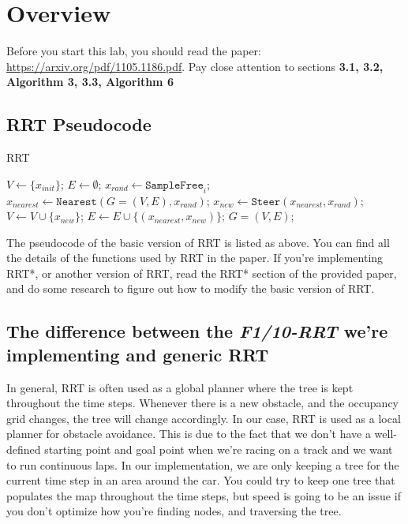 \documentclass[letter]{article}
\begin{document}
\section{Overview}
Before you start this lab, you should read the paper: \href{https://arxiv.org/pdf/1105.1186.pdf}{https://arxiv.org/pdf/1105.1186.pdf}. Pay close attention to sections \textbf{3.1, 3.2, Algorithm 3, 3.3, Algorithm 6}
\subsection{RRT Pseudocode}
\begin{algorithm}
\caption{RRT}
\begin{algorithmic}[1]
\STATE $V \leftarrow \{x_{init}\}$; $E\leftarrow \emptyset$;
\STATE $x_{rand}\leftarrow \texttt{SampleFree}_i$;
\STATE $x_{nearest}\leftarrow \texttt{Nearest}(G=(V,E),x_{rand})$;
\STATE $x_{new}\leftarrow\texttt{Steer}(x_{nearest},x_{rand})$;
\STATE $V\leftarrow V\cup \{x_{new}\}$; $E\leftarrow E\cup \{(x_{nearest}, x_{new})\}$;
\ENDIF
\ENDFOR
\RETURN $G=(V,E)$;
\end{algorithmic}
\end{algorithm}

The pseudocode of the basic version of RRT is listed as above. You can find all the details of the functions used by RRT in the paper. If you're implementing RRT*, or another version of RRT, read the RRT* section of the provided paper, and do some research to figure out how to modify the basic version of RRT.
\subsection{The difference between the \textit{F1/10-RRT} we're implementing and generic RRT}
In general, RRT is often used as a global planner where the tree is kept throughout the time steps. Whenever there is a new obstacle, and the occupancy grid changes, the tree will change accordingly. In our case, RRT is used as a local planner for obstacle avoidance. This is due to the fact that we don't have a well-defined starting point and goal point when we're racing on a track and we want to run continuous laps. In our implementation, we are only keeping a tree for the current time step in an area around the car. You could try to keep one tree that populates the map throughout the time steps, but speed is going to be an issue if you don't optimize how you're finding nodes, and traversing the tree.\\
\end{document}
